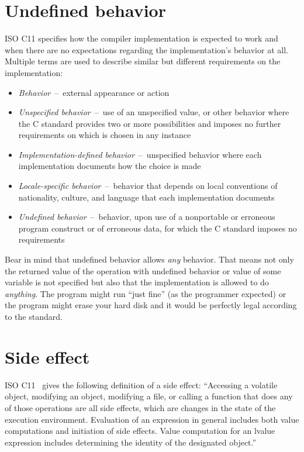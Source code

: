 \section{Undefined behavior}
ISO C11 specifies how the compiler implementation is expected to work and when there are no expectations regarding the implementation's behavior at all. Multiple terms are used to describe similar but different requirements on the implementation:~\cite{WG14N1570}
\begin{itemize}
    \item \emph{Behavior}~--~external  appearance or action
    \item \emph{Unspecified behavior}~--~use of an unspecified value, or other behavior where the C standard provides two or more possibilities and imposes no further requirements on which is chosen in any instance
    \item \emph{Implementation-defined behavior}~--~unspecified behavior where each implementation documents how the choice is made
    \item \emph{Locale-specific behavior}~--~behavior that depends on local conventions of nationality, culture, and language that each implementation documents
    \item \emph{Undefined behavior}~--~behavior, upon use of a nonportable or erroneous program construct or of erroneous data, for which the C standard imposes no requirements
\end{itemize}

Bear in mind that undefined behavior allows \emph{any} behavior. That means not only the returned value of the operation with undefined behavior or value of some variable is not specified but also that the implementation is allowed to do \emph{anything}. The program might run ``just fine'' (as the programmer expected) or the program might erase your hard disk and it would be perfectly legal according to the standard.

\section{Side effect}
ISO C11~\cite{WG14N1570} gives the following definition of a side effect: ``Accessing a volatile object, modifying an object, modifying a file, or calling a function that does any of those operations are all side effects, which are changes in the state of the execution environment. Evaluation of an expression in general includes both value computations and initiation of side effects. Value computation for an lvalue expression includes determining the identity of the designated object.''

